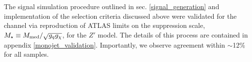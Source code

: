\begin{table}[!htbp]
{%
}
\label{monojet_SRs}
\end{table}

The signal simulation procedure outlined in sec. \ref{signal_generation} and implementation of the selection criteria discussed above were validated for the \monojet channel via reproduction of ATLAS limits on the suppression scale, $M_{\star} \equiv M_{\mathrm{med}} / \sqrt{g_q g_{\chi}}$, for the $Z'$ model. The details of this process are contained in appendix \ref{monojet_validation}. Importantly, we observe agreement within $\sim$12\% for all samples.



